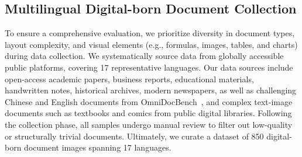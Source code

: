 \documentclass[runningheads]{llncs}
\begin{document}
\subsection{Multilingual Digital-born Document Collection}
To ensure a comprehensive evaluation, we prioritize diversity in document types, layout complexity, and visual elements (e.g., formulas, images, tables, and charts) during data collection. We systematically source data from globally accessible public platforms, covering 17 representative languages. Our data sources include open-access academic papers, business reports, educational materials, handwritten notes, historical archives, modern newspapers, as well as challenging Chinese and English documents from OmniDocBench~\cite{omnidocbench}, and complex text-image documents such as textbooks and comics from public digital libraries. Following the collection phase, all samples undergo manual review to filter out low-quality or structurally trivial documents. Ultimately, we curate a dataset of 850 digital-born document images spanning 17 languages.
\end{document}
